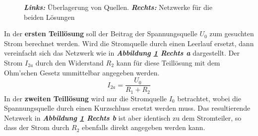 \begin{figure}[H]
\quad 
{}
\centering
\caption{\textbf{\textit{Links:}} Überlagerung von Quellen. \textbf{\textit{Rechts:}} Netzwerke für die beiden Lösungen}
\label{fig_IIIdd}
\end{figure}
\noindent In der \textbf{ersten Teillösung} soll der Beitrag der Spannungsquelle $U_0$ zum gesuchten Strom berechnet werden. Wird die Stromquelle durch einen Leerlauf ersetzt, dann vereinfacht sich das Netzwerk wie in \textbf{\textit{Abbildung \ref{fig_IIIdd} Rechts a}} dargestellt. Der Strom $I_{2a}$ durch den Widerstand $R_2$ kann für diese Teillösung mit dem Ohm'schen Gesetz ummittelbar angegeben werden.
\begin{equation} 
\boxed{I_{2a}=\dfrac{U_0}{R_1+R_2}}
\end{equation} 
In der \textbf{zweiten Teillösung} wird nur die Stromquelle $I_0$ betrachtet, wobei die Spannungsquelle durch einen Kurzschluss ersetzt werden muss. Das resultierende Netzwerk in \textbf{\textit{Abbildung \ref{fig_IIIdd} Rechts b}} ist aber identisch zu dem Stromteiler, so dass der Strom durch $R_2$ ebenfalls direkt angegeben werden kann.
